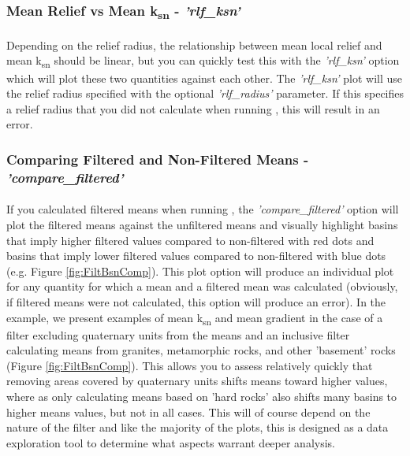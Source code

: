 \subsubsection{Mean Relief vs Mean k\textsubscript{sn} - \textit{'rlf\_ksn'}} \label{sec:rlfksn}
\paragraph{}Depending on the relief radius, the relationship between mean local relief and mean k\textsubscript{sn} should be linear, but you can quickly test this with the \textit{'rlf\_ksn'} option which will plot these two quantities against each other. The \textit{'rlf\_ksn'} plot will use the relief radius specified with the optional \textit{'rlf\_radius'} parameter. If this specifies a relief radius that you did not calculate when running , this will result in an error. 

\subsubsection{Comparing Filtered and Non-Filtered Means - \textit{'compare\_filtered'}} \label{sec:compfilt}

\paragraph{}If you calculated filtered means when running , the \textit{'compare\_filtered'} option will plot the filtered means against the unfiltered means and visually highlight basins that imply higher filtered values compared to non-filtered with red dots and basins that imply lower filtered values compared to non-filtered with blue dots (e.g. Figure \ref{fig:FiltBsnComp}). This plot option will produce an individual plot for any quantity for which a mean and a filtered mean was calculated (obviously, if filtered means were not calculated, this option will produce an error). In the example, we present examples of mean k\textsubscript{sn} and mean gradient in the case of a filter excluding quaternary units from the means and an inclusive filter calculating means from granites, metamorphic rocks, and other 'basement' rocks (Figure \ref{fig:FiltBsnComp}). This allows you to assess relatively quickly that removing areas covered by quaternary units shifts means toward higher values, where as only calculating means based on 'hard rocks' also shifts many basins to higher means values, but not in all cases. This will of course depend on the nature of the filter and like the majority of the plots, this is designed as a data exploration tool to determine what aspects warrant deeper analysis.

